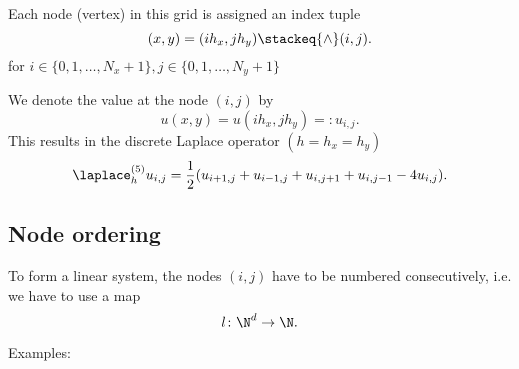 
Each node (vertex) in this grid is assigned an index tuple
\[
	(x,y) = (ih_{x}, jh_{y}) \stackeq{\wedge} (i,j)
.\] 
for $i \in \{0,1, \ldots , N_{x}+1\}, j \in  \{0,1, \ldots , N_{y}+1\}$

We denote the value at the node $(i,j)$ by
\[
	u(x,y)=u(ih_{x},jh_{y})=:u_{i,j}
.\] 
This results in the discrete Laplace operator $(h=h_{x}=h_{y})$
\[
	\laplace_{h}^{(5)}u_{i,j}=\frac{1}{2}(u_{i+1,j}+u_{i-1,j} +u_{i,j+1}+ u_{i,j-1} - 4u_{i,j})
.\]

\newpage
\subsection{Node ordering}%
\label{sec:Node ordering}
To form a linear system, the nodes $(i,j)$ have to be numbered consecutively, i.e. we have to use a map
\[
	l\colon \N^{d} \rightarrow \N
.\] 

Examples:

